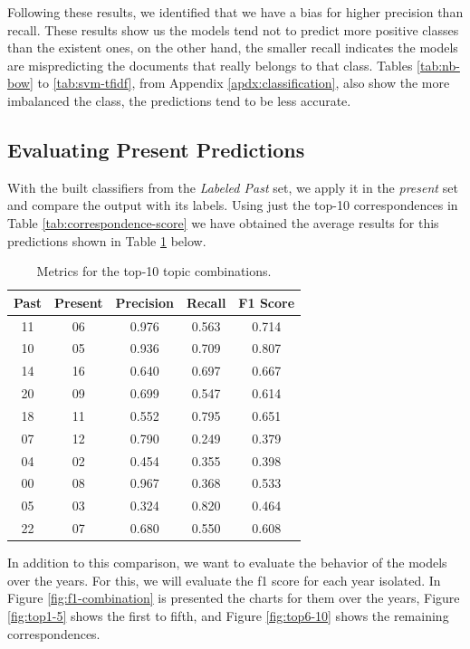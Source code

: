Following these results, we identified that we have a bias for higher precision than recall. These results show us the models tend not to predict more positive classes than the existent ones, on the other hand, the smaller recall indicates the models are mispredicting the documents that really belongs to that class. Tables \ref{tab:nb-bow} to \ref{tab:svm-tfidf}, from Appendix \ref{apdx:classification}, also show the more imbalanced the class, the predictions tend to be less accurate.


\subsection{Evaluating Present Predictions}

With the built classifiers from the \textit{Labeled Past} set, we apply it in the \textit{present} set and compare the output with its labels. Using just the top-10 correspondences in Table \ref{tab:correspondence-score} we have obtained the average results for this predictions shown in Table \ref{tab:avg-combination-score} below.

\begin{table}[h!]
	\centering
	\caption{Metrics for the top-10 topic combinations.}
	\label{tab:avg-combination-score}
	\begin{tabular}{cc|ccc}
		\toprule
		\textbf{Past} & \textbf{Present} & \textbf{Precision} & \textbf{Recall} & \textbf{F1 Score} \\ \midrule
		11 & 06 & 0.976 & 0.563 & 0.714 \\
		10 & 05 & 0.936 & 0.709 & 0.807 \\
		14 & 16 & 0.640 & 0.697 & 0.667 \\
		20 & 09 & 0.699 & 0.547 & 0.614 \\
		18 & 11 & 0.552 & 0.795 & 0.651 \\
		07 & 12 & 0.790 & 0.249 & 0.379 \\
		04 & 02 & 0.454 & 0.355 & 0.398 \\
		00 & 08 & 0.967 & 0.368 & 0.533 \\
		05 & 03 & 0.324 & 0.820 & 0.464 \\
		22 & 07 & 0.680 & 0.550 & 0.608 \\
		\bottomrule
	\end{tabular}
\end{table}

In addition to this comparison, we want to evaluate the behavior of the models over the years. For this, we will evaluate the f1 score for each year isolated. In Figure \ref{fig:f1-combination} is presented the charts for them over the years, Figure \ref{fig:top1-5} shows the first to fifth, and Figure \ref{fig:top6-10} shows the remaining correspondences.

